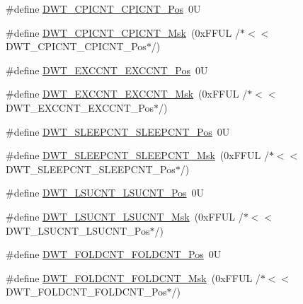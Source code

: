 \begin{DoxyCompactItemize}
\item 
\#define \hyperlink{group___c_m_s_i_s___d_w_t_ga80e9ad8f6a9e2344af8a3cf989bebe3d}{D\+W\+T\+\_\+\+C\+P\+I\+C\+N\+T\+\_\+\+C\+P\+I\+C\+N\+T\+\_\+\+Pos}~0U
\item 
\#define \hyperlink{group___c_m_s_i_s___d_w_t_ga76f39e7bca3fa86a4dbf7b8f6adb7217}{D\+W\+T\+\_\+\+C\+P\+I\+C\+N\+T\+\_\+\+C\+P\+I\+C\+N\+T\+\_\+\+Msk}~(0x\+F\+F\+U\+L /$\ast$$<$$<$ D\+W\+T\+\_\+\+C\+P\+I\+C\+N\+T\+\_\+\+C\+P\+I\+C\+N\+T\+\_\+\+Pos$\ast$/)
\item 
\#define \hyperlink{group___c_m_s_i_s___d_w_t_ga031c693654030d4cba398b45d2925b1d}{D\+W\+T\+\_\+\+E\+X\+C\+C\+N\+T\+\_\+\+E\+X\+C\+C\+N\+T\+\_\+\+Pos}~0U
\item 
\#define \hyperlink{group___c_m_s_i_s___d_w_t_ga057fa604a107b58a198bbbadb47e69c9}{D\+W\+T\+\_\+\+E\+X\+C\+C\+N\+T\+\_\+\+E\+X\+C\+C\+N\+T\+\_\+\+Msk}~(0x\+F\+F\+U\+L /$\ast$$<$$<$ D\+W\+T\+\_\+\+E\+X\+C\+C\+N\+T\+\_\+\+E\+X\+C\+C\+N\+T\+\_\+\+Pos$\ast$/)
\item 
\#define \hyperlink{group___c_m_s_i_s___d_w_t_ga0371a84a7996dc5852c56afb2676ba1c}{D\+W\+T\+\_\+\+S\+L\+E\+E\+P\+C\+N\+T\+\_\+\+S\+L\+E\+E\+P\+C\+N\+T\+\_\+\+Pos}~0U
\item 
\#define \hyperlink{group___c_m_s_i_s___d_w_t_ga1e340751d71413fef400a0a1d76cc828}{D\+W\+T\+\_\+\+S\+L\+E\+E\+P\+C\+N\+T\+\_\+\+S\+L\+E\+E\+P\+C\+N\+T\+\_\+\+Msk}~(0x\+F\+F\+U\+L /$\ast$$<$$<$ D\+W\+T\+\_\+\+S\+L\+E\+E\+P\+C\+N\+T\+\_\+\+S\+L\+E\+E\+P\+C\+N\+T\+\_\+\+Pos$\ast$/)
\item 
\#define \hyperlink{group___c_m_s_i_s___d_w_t_gab9394c7911b0b4312a096dad91d53a3d}{D\+W\+T\+\_\+\+L\+S\+U\+C\+N\+T\+\_\+\+L\+S\+U\+C\+N\+T\+\_\+\+Pos}~0U
\item 
\#define \hyperlink{group___c_m_s_i_s___d_w_t_ga2186d7fc9317e20bad61336ee2925615}{D\+W\+T\+\_\+\+L\+S\+U\+C\+N\+T\+\_\+\+L\+S\+U\+C\+N\+T\+\_\+\+Msk}~(0x\+F\+F\+U\+L /$\ast$$<$$<$ D\+W\+T\+\_\+\+L\+S\+U\+C\+N\+T\+\_\+\+L\+S\+U\+C\+N\+T\+\_\+\+Pos$\ast$/)
\item 
\#define \hyperlink{group___c_m_s_i_s___d_w_t_ga7f8af5ac12d178ba31a516f6ed141455}{D\+W\+T\+\_\+\+F\+O\+L\+D\+C\+N\+T\+\_\+\+F\+O\+L\+D\+C\+N\+T\+\_\+\+Pos}~0U
\item 
\#define \hyperlink{group___c_m_s_i_s___d_w_t_ga9cb73d0342d38b14e41027d3c5c02647}{D\+W\+T\+\_\+\+F\+O\+L\+D\+C\+N\+T\+\_\+\+F\+O\+L\+D\+C\+N\+T\+\_\+\+Msk}~(0x\+F\+F\+U\+L /$\ast$$<$$<$ D\+W\+T\+\_\+\+F\+O\+L\+D\+C\+N\+T\+\_\+\+F\+O\+L\+D\+C\+N\+T\+\_\+\+Pos$\ast$/)
\item 

\end{DoxyCompactItemize}

